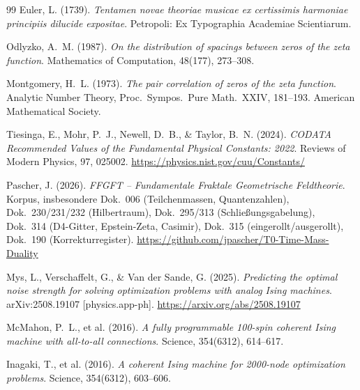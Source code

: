 \begin{thebibliography}{99}
Euler, L. (1739).
\textit{Tentamen novae theoriae musicae ex certissimis harmoniae
principiis dilucide expositae}.
Petropoli: Ex Typographia Academiae Scientiarum.

Odlyzko, A.~M. (1987).
\textit{On the distribution of spacings between zeros of the zeta
function}.
Mathematics of Computation, 48(177), 273--308.

Montgomery, H.~L. (1973).
\textit{The pair correlation of zeros of the zeta function}.
Analytic Number Theory, Proc.\ Sympos.\ Pure Math.\ XXIV, 181--193.
American Mathematical Society.

Tiesinga, E., Mohr, P.~J., Newell, D.~B., \& Taylor, B.~N. (2024).
\textit{CODATA Recommended Values of the Fundamental Physical
Constants: 2022}.
Reviews of Modern Physics, 97, 025002.
\url{https://physics.nist.gov/cuu/Constants/}

Pascher, J. (2026).
\textit{FFGFT -- Fundamentale Fraktale Geometrische Feldtheorie}.
Korpus, insbesondere Dok.~006 (Teilchenmassen, Quantenzahlen),
Dok.~230/231/232 (Hilbertraum), Dok.~295/313
(Schlie\ss ungsgabelung), Dok.~314 (D4-Gitter, Epstein-Zeta, Casimir),
Dok.~315 (eingerollt/ausgerollt), Dok.~190 (Korrekturregister).
\url{https://github.com/jpascher/T0-Time-Mass-Duality}

Mys, L., Verschaffelt, G., \& Van der Sande, G. (2025).
\textit{Predicting the optimal noise strength for solving optimization
problems with analog Ising machines}.
arXiv:2508.19107 [physics.app-ph].
\url{https://arxiv.org/abs/2508.19107}

McMahon, P.~L., et al. (2016).
\textit{A fully programmable 100-spin coherent Ising machine with all-to-all
connections}.
Science, 354(6312), 614--617.

Inagaki, T., et al. (2016).
\textit{A coherent Ising machine for 2000-node optimization problems}.
Science, 354(6312), 603--606.

\end{thebibliography}
